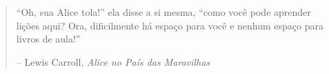 
\newpage \vspace*{8cm}
\thispagestyle{empty}
\begin{quotation}
\begin{center}
  \large
  \enquote{Oh, sua Alice tola!} ela disse a si mesma, \enquote{como você pode aprender lições aqui? Ora, dificilmente há espaço para você e nenhum espaço para livros de aula!}
\end{center}
\begin{flushright} -- Lewis Carroll, \textit{Alice no País das Maravilhas}\end{flushright}
\end{quotation}